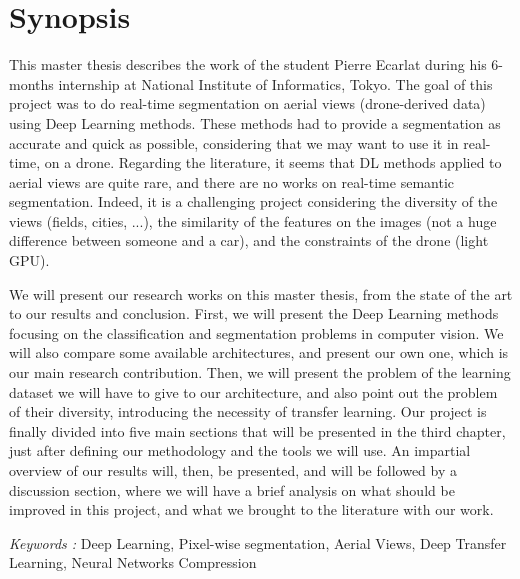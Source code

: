 \section*{Synopsis}

This master thesis describes the work of the student Pierre Ecarlat during his 6-months internship at National Institute of Informatics, Tokyo. The goal of this project was to do real-time segmentation on aerial views (drone-derived data) using Deep Learning methods. These methods had to provide a segmentation as accurate and quick as possible, considering that we may want to use it in real-time, on a drone. Regarding the literature, it seems that DL methods applied to aerial views are quite rare, and there are no works on real-time semantic segmentation. Indeed, it is a challenging project considering the diversity of the views (fields, cities, ...), the similarity of the features on the images (not a huge difference between someone and a car), and the constraints of the drone (light GPU). 

We will present our research works on this master thesis, from the state of the art to our results and conclusion. First, we will present the Deep Learning methods focusing on the classification and segmentation problems in computer vision. We will also compare some available architectures, and present our own one, which is our main research contribution. Then, we will present the problem of the learning dataset we will have to give to our architecture, and also point out the problem of their diversity, introducing the necessity of transfer learning. Our project is finally divided into five main sections that will be presented in the third chapter, just after defining our methodology and the tools we will use. An impartial overview of our results will, then, be presented, and will be followed by a discussion section, where we will have a brief analysis on what should be improved in this project, and what we brought to the literature with our work.

\vspace{1cm}

\noindent
\textit{Keywords :} Deep Learning, Pixel-wise segmentation, Aerial Views, Deep Transfer Learning, Neural Networks Compression
